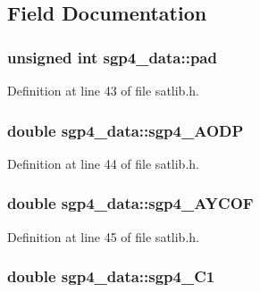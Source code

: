 \subsection{Field Documentation}
\hypertarget{structsgp4__data_a2117bfe04c91b6b4232bafd5ef928561}{
\subsubsection[{pad}]{\setlength{\rightskip}{0pt plus 5cm}unsigned int sgp4\-\_\-data\-::pad}}\label{structsgp4__data_a2117bfe04c91b6b4232bafd5ef928561}


Definition at line 43 of file satlib.\-h.

\hypertarget{structsgp4__data_aa2d4b2dec5c1e4516155d62f60f00802}{
\subsubsection[{sgp4\-\_\-\-A\-O\-D\-P}]{\setlength{\rightskip}{0pt plus 5cm}double sgp4\-\_\-data\-::sgp4\-\_\-\-A\-O\-D\-P}}\label{structsgp4__data_aa2d4b2dec5c1e4516155d62f60f00802}


Definition at line 44 of file satlib.\-h.

\hypertarget{structsgp4__data_acc26c407f2444fb3f8fb139c285ba3ca}{
\subsubsection[{sgp4\-\_\-\-A\-Y\-C\-O\-F}]{\setlength{\rightskip}{0pt plus 5cm}double sgp4\-\_\-data\-::sgp4\-\_\-\-A\-Y\-C\-O\-F}}\label{structsgp4__data_acc26c407f2444fb3f8fb139c285ba3ca}


Definition at line 45 of file satlib.\-h.

\hypertarget{structsgp4__data_a79b7bc60972ac0c469516ce93e1399d2}{
\subsubsection[{sgp4\-\_\-\-C1}]{\setlength{\rightskip}{0pt plus 5cm}double sgp4\-\_\-data\-::sgp4\-\_\-\-C1}}\label{structsgp4__data_a79b7bc60972ac0c469516ce93e1399d2}


